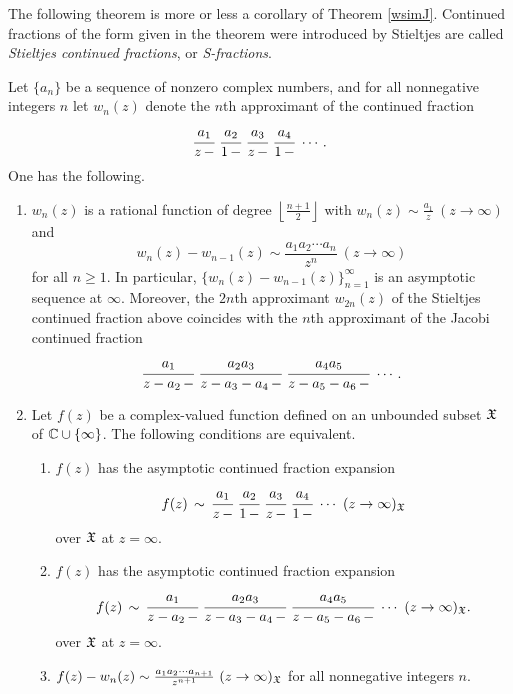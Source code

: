 \documentclass[12pt]{article}
\begin{document}
The following theorem is more or less a corollary of Theorem \ref{wsimJ}.  Continued fractions of the form given in the theorem were introduced by Stieltjes are called {\it Stieltjes continued fractions}, or {\it S-fractions}.  


\begin{theorem}\label{wsim}
Let $\{a_n\}$ be a sequence of nonzero complex numbers, and for all nonnegative integers $n$ let  $w_n(z)$ denote the $n$th approximant of the continued fraction
\begin{eqnarray*}
\cfrac{a_1} {z \, -} \ \cfrac{a_2} {1 \, -}  \ \cfrac{a_3} {z \, -} \ \cfrac{a_4} {1 \, -} \  \cdots.
\end{eqnarray*}
One has the following.
\begin{enumerate}
\item $w_n(z)$ is a rational function of degree ${\left\lfloor \frac{n+1}{2}\right\rfloor}$  with $w_n(z) \sim \frac{a_1}{z}  \ (z \to \infty)$ and $$w_n(z)-w_{n-1}(z) \sim \frac{a_1 a_2 \cdots a_n}{z^{n}}  \ (z \to \infty)$$ for all $n \geq 1$.   In particular, $\{w_n(z)-w_{n-1}(z)\}_{n = 1}^\infty$ is an asymptotic sequence at $\infty$.  Moreover, the $2n$th approximant $w_{2n}(z)$ of the Stieltjes continued fraction above coincides with the $n$th approximant of the Jacobi continued fraction
\begin{eqnarray*}
\cfrac{a_1}{z-a_2 \,-} \  \cfrac{a_2 a_3}{z-a_3-a_4 \,-} \  \cfrac{a_4a_5}{z-a_5-a_6 \,-}  \ \cdots.
\end{eqnarray*}
 \item Let $f(z)$ be a complex-valued function defined on an unbounded subset ${\mathfrak X}$ of ${\mathbb C} \cup \{\infty\}$.  The following conditions are equivalent.
\begin{enumerate}
\item $f(z)$  has the asymptotic continued fraction expansion
\begin{eqnarray*}
f(z) \, \sim \, \cfrac{a_1} {z \, -} \ \cfrac{a_2} {1 \, -}  \ \cfrac{a_3} {z \, -} \ \cfrac{a_4} {1 \, -} \  \cdots  \ (z \to \infty)_\XX
\end{eqnarray*}
over ${\mathfrak X}$ at $z = \infty$.
\item $f(z)$  has the asymptotic continued fraction expansion
\begin{eqnarray*}
f(z) \, \sim \, \cfrac{a_1}{z-a_2 \,-} \  \cfrac{a_2 a_3}{z-a_3-a_4 \,-} \  \cfrac{a_4a_5}{z-a_5-a_6 \,-} \  \cdots  \ (z \to \infty)_{\mathfrak X}.
\end{eqnarray*}
over ${\mathfrak X}$ at $z = \infty$.    
\item $f(z) - w_n(z) \sim  \frac{a_1 a_2 \cdots a_{n+1}}{z^{n+1}} \ (z \to \infty)_{\mathfrak X}$ for all  nonnegative integers $n$.

\end{enumerate}
\end{enumerate}
\end{theorem}
\end{document}
